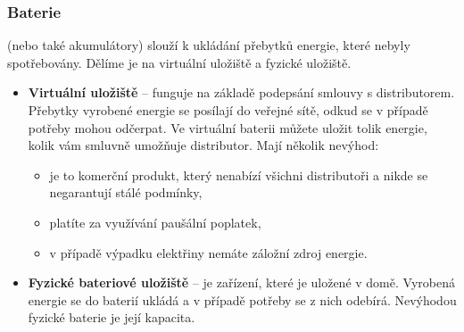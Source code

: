 \subsubsection{Baterie}

(nebo také akumulátory) slouží k ukládání přebytků energie, které nebyly spotřebovány.
Dělíme je na virtuální uložiště a fyzické uložiště.

\begin{itemize}
    \item \textbf{Virtuální uložiště} -- funguje na základě podepsání smlouvy s distributorem. Přebytky vyrobené energie se posílají do veřejné sítě, odkud se v případě potřeby mohou odčerpat.  Ve virtuální baterii můžete uložit tolik energie, kolik vám smluvně umožňuje distributor. Mají několik nevýhod:
    \begin{itemize}
        \item je to komerční produkt, který nenabízí všichni distributoři a nikde se negarantují stálé podmínky,
        \item platíte za využívání paušální poplatek,
        \item v případě výpadku elektřiny nemáte záložní zdroj energie.
    \end{itemize}
    \item \textbf{Fyzické bateriové uložiště} -- je zařízení, které je uložené v domě. Vyrobená energie se do baterií ukládá a v případě potřeby se z nich odebírá. Nevýhodou fyzické baterie je její kapacita.
\end{itemize}




